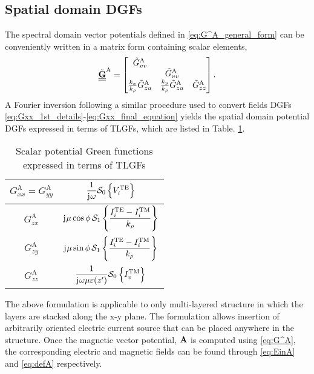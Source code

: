 \documentclass[12pt]{article}
\begin{document}
\subsection{Spatial domain DGFs}
%
The spectral domain vector potentials defined in \eqref{eq:G^A_general_form} can be conveniently written in a matrix form containing scalar elements,
%
\begin{equation}
  \underline{\underline{\tilde{\mathbf{G}}}}^\mathrm{A}
  =
  \begin{bmatrix}
    \tilde{G}^\mathrm{A}_{vv} &  &  \\
     & \tilde{G}^\mathrm{A}_{vv} & \\
     \frac{k_x}{k_{\rho}} \tilde{G}^\mathrm{A}_{zu} & \frac{k_y}{k_{\rho}} \tilde{G}^\mathrm{A}_{zu} & \tilde{G}^\mathrm{A}_{zz}
  \end{bmatrix}
  \label{eq:G_A_matrix_form}.
\end{equation}
%
A Fourier inversion following a similar procedure used to convert fields DGFs \eqref{eq:Gxx_1st_details}-\eqref{eq:Gxx_final_equation} yields the spatial domain potential DGFs expressed in terms of TLGFs, which are listed in Table. \ref{tab:G_scalar_list}.
%
\begin{table}[!ht]
  \begin{center}
    \begin{tabular}{|| c | c ||}
      \hline
      $G^\mathrm{A}_{xx} = G^\mathrm{A}_{yy}$ & $ \displaystyle \frac{1}{\mathrm{j}\mkern1mu \omega}\mathcal{S}_0 \left \{ V_i^{\mathrm{TE}} \right \} $ \\ [2.5ex] \hline
      $G^\mathrm{A}_{zx}$ & $ \displaystyle \mathrm{j}\mkern1mu \mu  \cos \phi \, \mathcal{S}_1 \left \{  \frac {I_i^{\mathrm{TE}} - I_i^{\mathrm{TM}}}{k_{\rho}}  \right \} $ \\ [2.5ex] \hline
      $G^\mathrm{A}_{zy}$ & $ \displaystyle \mathrm{j}\mkern1mu \mu  \sin \phi \, \mathcal{S}_1 \left \{  \frac {I_i^{\mathrm{TE}} - I_i^{\mathrm{TM}}}{k_{\rho}}  \right \} $ \\ [2.5ex] \hline
      $G^\mathrm{A}_{zz}$ & $ \displaystyle \frac{1}{\mathrm{j}\mkern1mu \omega \mu \varepsilon(z')} \mathcal{S}_0 \left \{ I_v^{\mathrm{TM}} \right \} $ \\ [2.5ex]
      \hline
    \end{tabular}
  \end{center}
  \caption{Scalar potential Green functions expressed in terms of TLGFs \cite{Michalski2016a}}
  \label{tab:G_scalar_list}
\end{table}
%

The above formulation is applicable to only multi-layered structure in which the layers are stacked along the x-y plane. The formulation allows insertion of arbitrarily oriented electric current source that can be placed anywhere in the structure. Once the magnetic vector potential, $\mathbf{A}$ is computed using \eqref{eq:G^A}, the corresponding electric and magnetic fields can be found through \eqref{eq:EinA} and \eqref{eq:defA} respectively.
\end{document}
